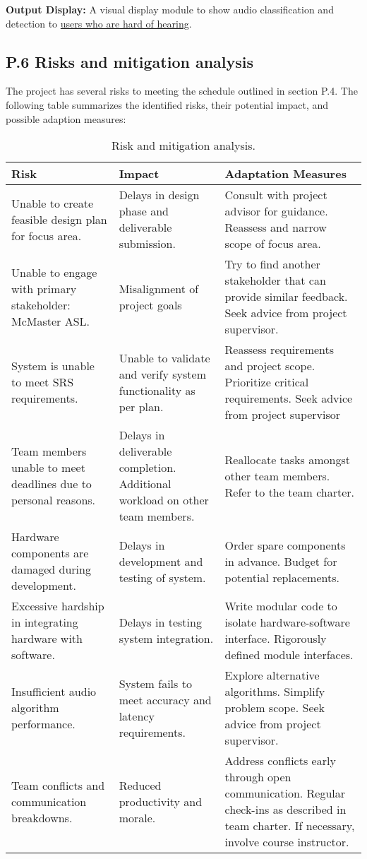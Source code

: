 \documentclass[12pt]{article}
\theoremstyle{definition}
\begin{document}
\textbf{Output Display:}
A visual display module to show audio classification and detection to
\hyperref[stakeholder:hardHearing]{users who are hard of hearing}.

\subsection{P.6 Risks and mitigation analysis}

The project has several risks to meeting the schedule outlined in section P.4.
The following table summarizes the identified risks, their potential impact, and
possible adaption measures:

\begin{table}[H]
\centering
\begin{tabular}{|p{4cm}|p{6cm}|p{6cm}|}
  \hline
  \textbf{Risk} & \textbf{Impact} & \textbf{Adaptation Measures} \\
  \hline
  Unable to create feasible design plan for focus area. & Delays in design phase
  and deliverable submission. & Consult with project advisor for guidance.
  Reassess and narrow scope of focus area. \\
  \hline
  Unable to engage with primary stakeholder: McMaster ASL. & Misalignment of
  project goals & Try to find another stakeholder that can provide similar
  feedback. Seek advice from project supervisor. \\
  \hline
  System is unable to meet SRS requirements. & Unable to validate and verify
  system functionality as per plan. & Reassess requirements and project scope.
  Prioritize critical requirements. Seek advice from project supervisor\\
  \hline
  Team members unable to meet deadlines due to personal reasons. & Delays in
  deliverable completion. Additional workload on other team members. &
  Reallocate tasks amongst other team members. Refer to the team charter. \\
  \hline
  Hardware components are damaged during development. & Delays in development
  and testing of system. & Order spare components in advance. Budget for
  potential replacements. \\
  \hline
  Excessive hardship in integrating hardware with software. & Delays in testing
  system integration. & Write modular code to isolate hardware-software
  interface. Rigorously defined module interfaces.\\
  \hline
  Insufficient audio algorithm performance. & System fails to meet accuracy and
  latency requirements. & Explore alternative algorithms. Simplify problem
  scope. Seek advice from project supervisor. \\
  \hline
  Team conflicts and communication breakdowns. & Reduced productivity and
  morale. & Address conflicts early through open communication. Regular
  check-ins as described in team charter. If necessary, involve course
  instructor. \\
  \hline


\end{tabular}
\caption{Risk and mitigation analysis.}
\label{tab:risk-mitigation}
\end{table}
\end{document}
